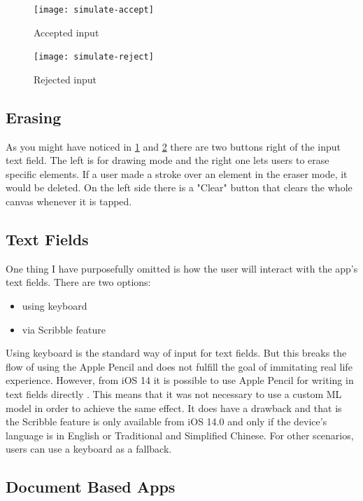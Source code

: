 \begin{figure}
    \texttt{[image: simulate-accept]}
    \caption{Accepted input}\label{simulate-accept}
\end{figure}

\begin{figure}
    \texttt{[image: simulate-reject]}
    \caption{Rejected input}\label{simulate-reject}
\end{figure}

\subsection{Erasing}

As you might have noticed in \ref{simulate-accept} and \ref{simulate-reject} there are two buttons right of the input text field. The left is for drawing mode and the right one lets users to erase specific elements. If a user made a stroke over an element in the eraser mode, it would be deleted. On the left side there is a "Clear" button that clears the whole canvas whenever it is tapped.

\subsection{Text Fields}

One thing I have purposefully omitted is how the user will interact with the app's text fields. There are two options:
\begin{itemize}
    \item using keyboard
    \item via Scribble feature
\end{itemize}

Using keyboard is the standard way of input for text fields. But this breaks the flow of using the Apple Pencil and does not fulfill the goal of immitating real life experience. However, from iOS 14 it is possible to use Apple Pencil for writing in text fields directly \cite{scribble}. This means that it was not necessary to use a custom ML model in order to achieve the same effect. It does have a drawback and that is the Scribble feature is only available from iOS 14.0 and only if the device's language is in English or Traditional and Simplified Chinese. For other scenarios, users can use a keyboard as a fallback.

\subsection{Document Based Apps}

